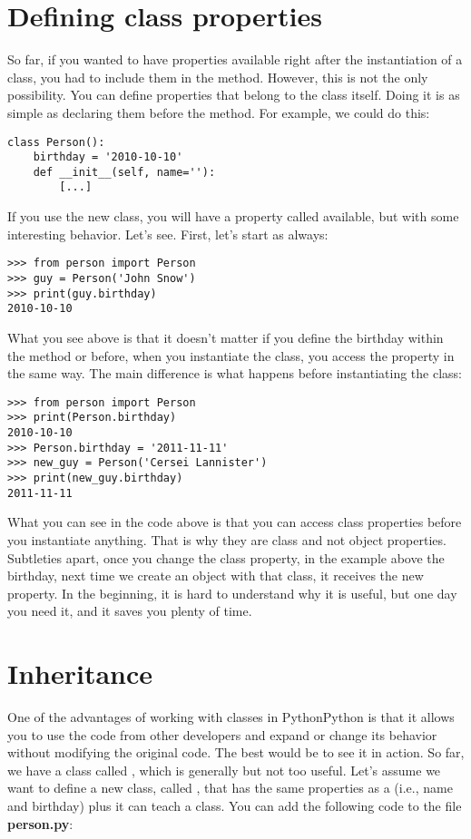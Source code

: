 \section{Defining class properties}
So far, if you wanted to have properties available right after the instantiation of a class, you had to include them in the  method. However, this is not the only possibility. You can define properties that belong to the class itself. Doing it is as simple as declaring them before the  method. For example, we could do this:

\begin{verbatim}
class Person():
    birthday = '2010-10-10'
    def __init__(self, name=''):
        [...]
\end{verbatim}

If you use the new  class, you will have a property called  available, but with some interesting behavior. Let's see. First, let's start as always:

\begin{verbatim}
>>> from person import Person
>>> guy = Person('John Snow')
>>> print(guy.birthday)
2010-10-10
\end{verbatim}

What you see above is that it doesn't matter if you define the birthday within the  method or before, when you instantiate the class, you access the property in the same way. The main difference is what happens before instantiating the class:

\begin{verbatim}
>>> from person import Person
>>> print(Person.birthday)
2010-10-10
>>> Person.birthday = '2011-11-11'
>>> new_guy = Person('Cersei Lannister')
>>> print(new_guy.birthday)
2011-11-11
\end{verbatim}

What you can see in the code above is that you can access class properties before you instantiate anything. That is why they are class and not object properties. Subtleties apart, once you change the class property, in the example above the birthday, next time we create an object with that class, it receives the new property. In the beginning, it is hard to understand why it is useful, but one day you need it, and it saves you plenty of time.

\section{Inheritance}
One of the advantages of working with classes in PythonPython is that it allows you to use the code from other developers and expand or change its behavior without modifying the original code. The best would be to see it in action. So far, we have a class called , which is generally but not too useful. Let's assume we want to define a new class, called , that has the same properties as a  (i.e., name and birthday) plus it can teach a class. You can add the following code to the file \textbf{person.py}:

